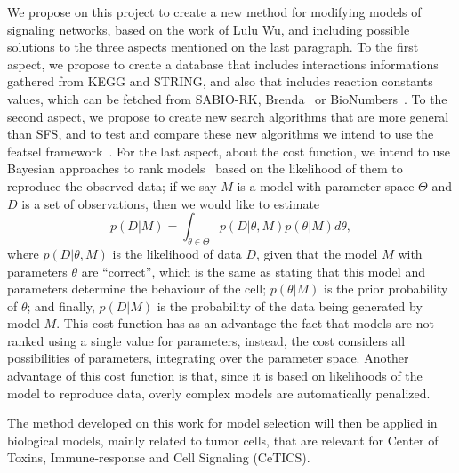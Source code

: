 We propose on this project to create a new method for modifying 
models of signaling networks, based on the work of Lulu Wu, and 
including possible solutions to the three aspects mentioned on the last 
paragraph. To the first aspect, we propose to create a database that 
includes interactions informations gathered from KEGG and STRING, and 
also that includes reaction constants values, which can be fetched from
SABIO-RK, Brenda~\cite{Schomburg2004} or BioNumbers~\cite{Milo2009}. To
the second aspect, we propose to create new search algorithms that are
more general than SFS, and to test and compare these new algorithms we
intend to use the featsel framework~\cite{REIS2017193}. For the last 
aspect, about the cost function, we intend to use Bayesian approaches to
rank models~\cite{Vyshemirsky2007} based on the likelihood of them to 
reproduce the observed data; if we say $M$ is a model with parameter 
space $\Theta$ and $D$ is a set of observations, then we would like to 
estimate 
\begin{equation*}
p (D|M) = \int_{\theta \in \Theta} p (D | \theta, M)p(\theta | M)d\theta, 
\end{equation*}
where $p (D|\theta, M)$ is the likelihood of data $D$, given that the
model $M$ with parameters $\theta$ are ``correct'', which is the same
as stating that this model and parameters determine the behaviour of the
cell; $p(\theta|M)$ is the prior probability of $\theta$; and finally, 
$p (D|M)$ is the probability 
of the data being generated by model $M$. This cost function has as an 
advantage the fact that models are not ranked using a single value for 
parameters, instead, the cost considers all possibilities of parameters, 
integrating over the parameter space. Another advantage of this cost 
function is that, since it is based on likelihoods of the model to 
reproduce data, overly complex models are automatically penalized.

The method developed on this work for model selection will then be 
applied in biological models, mainly related to tumor cells, that are
relevant for Center of Toxins, Immune-response and Cell Signaling 
(CeTICS).



